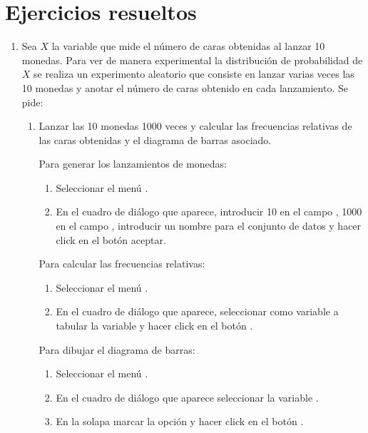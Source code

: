 \section{Ejercicios resueltos}
\begin{enumerate}[leftmargin=*] 
\item Sea $X$ la variable que mide el número de caras obtenidas al lanzar 10 monedas. Para ver de manera experimental
la distribución de probabilidad de $X$ se realiza un experimento aleatorio que consiste en lanzar varias veces las 10
monedas y anotar el número de caras obtenido en cada lanzamiento. Se pide:
\begin{enumerate}
\item Lanzar las 10 monedas 1000 veces y calcular las frecuencias relativas de las caras obtenidas y el diagrama de
barras asociado.
\begin{indicacion}Para generar los lanzamientos de monedas:
\begin{enumerate}
\item Seleccionar el menú .
\item En el cuadro de diálogo que aparece, introducir 10 en el campo , 1000 en el campo
, introducir un nombre para el conjunto de datos y hacer click en el
botón aceptar.
\end{enumerate}
Para calcular las frecuencias relativas:
\begin{enumerate}
\item Seleccionar el menú .
\item En el cuadro de diálogo que aparece, seleccionar como variable a tabular la variable  y hacer click
en el botón .
\end{enumerate}
Para dibujar el diagrama de barras:
\begin{enumerate}
\item Seleccionar el menú .
\item En el cuadro de diálogo que aparece seleccionar la variable .
\item En la solapa  marcar la opción  y hacer click en el
botón .
\end{enumerate}
\end{indicacion}


\end{enumerate}
\end{enumerate}
